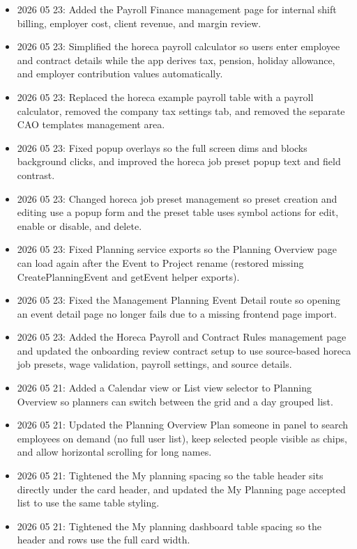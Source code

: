 \documentclass[11pt]{article}
\begin{document}
\begin{itemize}
    \item 2026 05 23: Added the Payroll Finance management page for internal shift billing, employer cost, client revenue, and margin review.
    \item 2026 05 23: Simplified the horeca payroll calculator so users enter employee and contract details while the app derives tax, pension, holiday allowance, and employer contribution values automatically.
    \item 2026 05 23: Replaced the horeca example payroll table with a payroll calculator, removed the company tax settings tab, and removed the separate CAO templates management area.
    \item 2026 05 23: Fixed popup overlays so the full screen dims and blocks background clicks, and improved the horeca job preset popup text and field contrast.
    \item 2026 05 23: Changed horeca job preset management so preset creation and editing use a popup form and the preset table uses symbol actions for edit, enable or disable, and delete.
    \item 2026 05 23: Fixed Planning service exports so the Planning Overview page can load again after the Event to Project rename (restored missing CreatePlanningEvent and getEvent helper exports).
    \item 2026 05 23: Fixed the Management Planning Event Detail route so opening an event detail page no longer fails due to a missing frontend page import.
    \item 2026 05 23: Added the Horeca Payroll and Contract Rules management page and updated the onboarding review contract setup to use source-based horeca job presets, wage validation, payroll settings, and source details.
    \item 2026 05 21: Added a Calendar view or List view selector to Planning Overview so planners can switch between the grid and a day grouped list.
    \item 2026 05 21: Updated the Planning Overview Plan someone in panel to search employees on demand (no full user list), keep selected people visible as chips, and allow horizontal scrolling for long names.
    \item 2026 05 21: Tightened the My planning spacing so the table header sits directly under the card header, and updated the My Planning page accepted list to use the same table styling.
    \item 2026 05 21: Tightened the My planning dashboard table spacing so the header and rows use the full card width.

\end{itemize}
\end{document}
